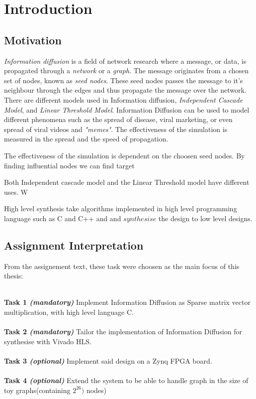 \chapter{Introduction} \label{intro}

\section{Motivation}
\textit{Information diffusion} is a field of network research where a message, or data, is propagated through a \textit{network} or a \textit{graph}. The message originates from a chosen set of nodes, known as \textit{seed nodes}. These seed nodes passes the message to it's neighbour through the edges and thus propagate the message over the network. There are different models used in Information diffusion, \textit{Independent Cascade Model}, and \textit{Linear Threshold Model}. Information Diffusion can be used to model different phenomena such as the spread of disease, viral marketing, or even spread of viral videos and \textit{"memes"}\cite{InformationDiffusionThroughBlogspace}. The effectiveness of the simulation is measured in the spread and the speed of propagation.

The effectiveness of the simulation is dependent on the choosen seed nodes. By finding influential nodes we can find target  


Both Independent cascade model and the Linear Threshold model have different uses. W




High level synthesis take algorithms implemented in high level programming language such as C and C++ and and $synthesise$ the design to low level designs\citep{52214}. 


\section{Assignment Interpretation}
From the assignement text, these task were choosen as the main focus of this thesis:\\ \hfil \\ \hfil

\textbf{Task 1 \textit{(mandatory)}} Implement Information Diffusion as Sparse matrix vector multiplication, with high level language C.  \\ \hfil \\ \hfil
\textbf{Task 2 \textit{(mandatory)}} Tailor the implementation of Information Diffusion for synthesise with Vivado HLS.   \\ \hfil \\ \hfil
\textbf{Task 3 \textit{(optional)}} Implement said design on a  Zynq FPGA board. \\ \hfil \\ \hfil
\textbf{Task 4 \textit{(optional)}} Extend the system to be able to handle graph in the size of toy graphs(containing $2^{26})$ nodes) \\ \hfil \\ \hfil

